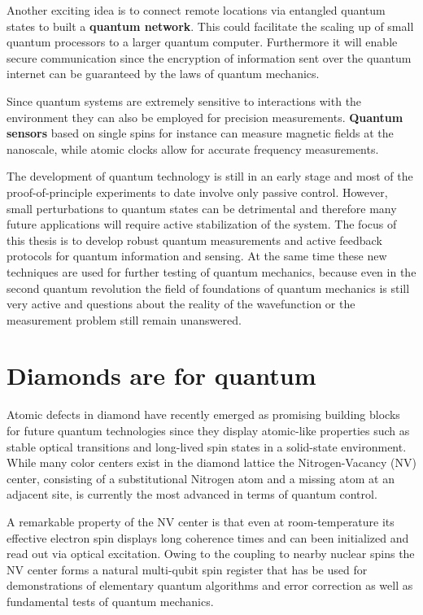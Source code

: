 Another exciting idea is to connect remote locations via entangled quantum states to built a \textbf{quantum network}. This could facilitate the scaling up of small quantum processors to a larger quantum computer. Furthermore it will enable secure communication since the encryption of information sent over the quantum internet can be guaranteed by the laws of quantum mechanics.

Since quantum systems are extremely sensitive to interactions with the environment they can also be employed for precision measurements. \textbf{Quantum sensors} based on single spins for instance can measure magnetic fields at the nanoscale, while atomic clocks allow for accurate frequency measurements.

The development of quantum technology is still in an early stage and most of the proof-of-principle experiments to date involve only passive control. However, small perturbations to quantum states can be detrimental and therefore many future applications will require active stabilization of the system. The focus of this thesis is to develop robust quantum measurements and active feedback protocols for quantum information and sensing. At the same time these new techniques are used for further testing of quantum mechanics, because even in the second quantum revolution the field of foundations of quantum mechanics is still very active and questions about the reality of the wavefunction or the measurement problem still remain unanswered. 

\section{Diamonds are for quantum}

Atomic defects in diamond have recently emerged as promising building blocks for future quantum technologies since they display atomic-like properties such as stable optical transitions and long-lived spin states in a solid-state environment. While many color centers exist in the diamond lattice the Nitrogen-Vacancy (NV) center, consisting of a substitutional Nitrogen atom and a missing atom at an adjacent site, is currently the most advanced in terms of quantum control.

A remarkable property of the NV center is that even at room-temperature its effective electron spin displays long coherence times and can been initialized and read out via optical excitation. Owing to the coupling to nearby nuclear spins the NV center forms a natural multi-qubit spin register that has be used for demonstrations of elementary quantum algorithms and error correction as well as fundamental tests of quantum mechanics.

